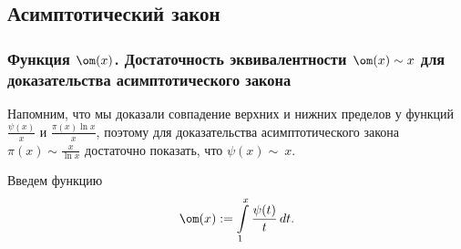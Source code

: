\subsection{Асимптотический закон}
\subsubsection{Функция $\om(x)$. Достаточность эквивалентности $\om(x)\sim x$ 
							для доказательства асимптотического закона}

Напомним, что мы доказали совпадение верхних и нижних пределов у функций 
$\frac{\psi(x)}{x}$ и $\frac{\pi(x)\ln{x}}{x}$, поэтому для доказательства
асимптотического закона $\pi(x)\sim\frac{x}{\ln{x}}$ достаточно показать,
что $\psi(x)\sim~x$.

Введем функцию 
$$
	\om(x):=\intlim_1^x \frac{\psi(t)}t\,dt.
$$

